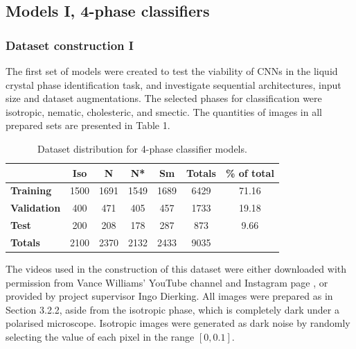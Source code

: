 \documentclass[12pt]{article}
\begin{document}
\subsection{Models I, 4-phase classifiers}
\subsubsection{Dataset construction I}
The first set of models were created to test the viability of CNNs in the liquid crystal phase identification task, and investigate sequential architectures, input size and dataset augmentations. The selected phases for classification were isotropic, nematic, cholesteric, and smectic. The quantities of images in all prepared sets are presented in Table 1.
\begin{table}[!htb]
\begin{center}
\caption{Dataset distribution for 4-phase classifier models.}
\begin{tabular}{l|c|c|c|c|c|c}
\toprule
& \textbf{Iso} & \textbf{N} & \textbf{N*} & \textbf{Sm} & \textbf{Totals} & \textbf{\% of total}\\
\midrule
\textbf{Training} & 1500 & 1691 & 1549 & 1689 & 6429 & 71.16\\
\textbf{Validation} & 400 & 471 & 405 & 457 & 1733 & 19.18\\
\textbf{Test} & 200 & 208 & 178 & 287 & 873 & 9.66\\
\midrule
\textbf{Totals} & 2100 & 2370 & 2132 & 2433 & 9035\\
\bottomrule
\end{tabular}
\end{center}
\end{table}
The videos used in the construction of this dataset were either downloaded with permission from Vance Williams' YouTube channel and Instagram page \cite{Williams20a, Williams20b}, or provided by project supervisor Ingo Dierking. All images were prepared as in Section 3.2.2, aside from the isotropic phase, which is completely dark under a polarised microscope. Isotropic images were generated as dark noise by randomly selecting the value of each pixel in the range $[0,0.1]$.
\end{document}
